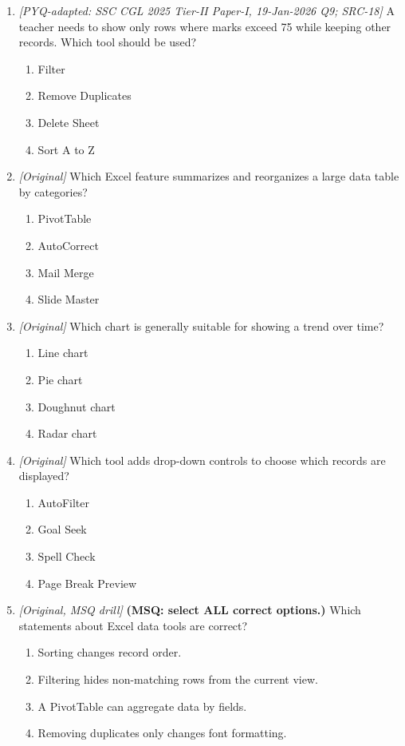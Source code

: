 \begin{enumerate}[label=\textbf{Q\arabic*.}, leftmargin=*]
\begin{enumerate}[label=\Alph*.]
  \end{enumerate}
\item \textit{[PYQ-adapted: SSC CGL 2025 Tier-II Paper-I, 19-Jan-2026 Q9; SRC-18]} A teacher needs to show only rows where marks exceed 75 while keeping other records. Which tool should be used?
  \begin{enumerate}[label=\Alph*.]
\item Filter
   \item Remove Duplicates
   \item Delete Sheet
   \item Sort A to Z
  \end{enumerate}

\item \textit{[Original]} Which Excel feature summarizes and reorganizes a large data table by categories?
  \begin{enumerate}[label=\Alph*.]
\item PivotTable
   \item AutoCorrect
   \item Mail Merge
   \item Slide Master
  \end{enumerate}

\item \textit{[Original]} Which chart is generally suitable for showing a trend over time?
  \begin{enumerate}[label=\Alph*.]
\item Line chart
   \item Pie chart
   \item Doughnut chart
   \item Radar chart
  \end{enumerate}

\item \textit{[Original]} Which tool adds drop-down controls to choose which records are displayed?
  \begin{enumerate}[label=\Alph*.]
\item AutoFilter
   \item Goal Seek
   \item Spell Check
   \item Page Break Preview
  \end{enumerate}

\item \textit{[Original, MSQ drill]} \textbf{(MSQ: select ALL correct options.)} Which statements about Excel data tools are correct?
  \begin{enumerate}[label=\Alph*.]
\item Sorting changes record order.
   \item Filtering hides non-matching rows from the current view.
   \item A PivotTable can aggregate data by fields.
   \item Removing duplicates only changes font formatting.
  \end{enumerate}

\end{enumerate}
